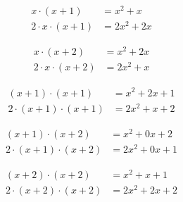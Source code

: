 \documentclass[11pt]{amsart}
\begin{document}
\vspace{0.5em}

$$
\begin{aligned}
x \cdot (x+1) &= x^2 + x  \\
2 \cdot x \cdot (x+1) &= 2 x^2 + 2 x
\end{aligned}
$$

\vspace{0.5em}

$$
\begin{aligned}
x \cdot (x+2) &= x^2 + 2 x  \\
2 \cdot x \cdot (x+2) &= 2 x^2 +  x
\end{aligned}
$$

\vspace{0.5em}


$$
\begin{aligned}
(x+1) \cdot (x+1) &= x^2 + 2x + 1 \\
2 \cdot (x+1) \cdot (x+1) &= 2 x^2 + x + 2
\end{aligned}
$$


\vspace{0.5em}

$$
\begin{aligned}
(x+1) \cdot (x+2) &= x^2 + 0x + 2 \\
2 \cdot (x+1) \cdot (x+2) &= 2 x^2 + 0x + 1
\end{aligned}
$$

\vspace{0.5em}

$$
\begin{aligned}
(x+2) \cdot (x+2) &= x^2 + x + 1 \\
2 \cdot (x+2) \cdot (x+2) &= 2 x^2 + 2x + 2
\end{aligned}
$$
\end{document}
